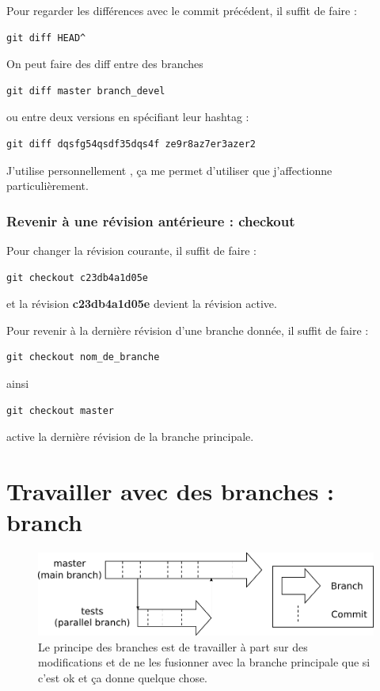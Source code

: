 \documentclass[a4paper,twoside]{article}
\begin{document}
Pour regarder les différences avec le commit précédent, il suffit de faire :
\begin{verbatim}
git diff HEAD^
\end{verbatim}

\bigskip

On peut faire des diff entre des branches 
\begin{verbatim}
git diff master branch_devel
\end{verbatim}
ou entre deux versions en spécifiant leur hashtag : 
\begin{verbatim}
git diff dqsfg54qsdf35dqs4f ze9r8az7er3azer2
\end{verbatim}

J'utilise personnellement , ça me permet d'utiliser  que j'affectionne particulièrement.

\subsubsection{Revenir à une révision antérieure : checkout}\label{sec:revenir_en_arriere}
Pour changer la révision courante, il suffit de faire : 
\begin{verbatim}
git checkout c23db4a1d05e
\end{verbatim}
et la révision \textbf{c23db4a1d05e} devient la révision active. 

Pour revenir à la dernière révision d'une branche donnée, il suffit de faire :
\begin{verbatim}
git checkout nom_de_branche
\end{verbatim}
ainsi
\begin{verbatim}
git checkout master
\end{verbatim}
active la dernière révision de la branche principale.



\section{Travailler avec des branches : branch}
\begin{figure}[htb]
\centering
\includegraphics[width=0.75\linewidth]{figure/branchs.pdf}
\caption{Le principe des branches est de travailler à part sur des modifications et de ne les fusionner avec la branche principale que si c'est ok et ça donne quelque chose.}
\end{figure}
\end{document}
